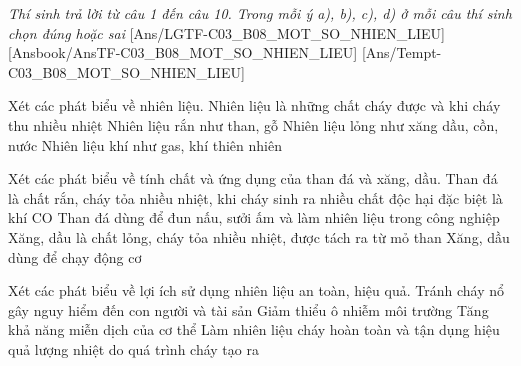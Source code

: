 \documentclass[Main.tex]{subfiles}
\begin{document}
\textit{\large Thí sinh trả lời từ câu 1 đến câu 10. Trong mỗi ý a), b), c), d) ở mỗi câu thí sinh chọn đúng hoặc sai}
[Ans/LGTF-C03_B08_MOT_SO_NHIEN_LIEU]
[Ansbook/AnsTF-C03_B08_MOT_SO_NHIEN_LIEU]
[Ans/Tempt-C03_B08_MOT_SO_NHIEN_LIEU]
\setcounter{ex}{0}

\begin{ex}%
	Xét các phát biểu về nhiên liệu.
	\choiceTF
	{Nhiên liệu là những chất cháy được và khi cháy thu nhiều nhiệt}
	{\True Nhiên liệu rắn như than, gỗ}
	{Nhiên liệu lỏng như xăng dầu, cồn, nước}
	{\True Nhiên liệu khí như gas, khí thiên nhiên}
\end{ex}

\begin{ex}%
	Xét các phát biểu về tính chất và ứng dụng của than đá và xăng, dầu.
	\choiceTF
	{\True Than đá là chất rắn, cháy tỏa nhiều nhiệt, khi cháy sinh ra nhiều chất độc hại đặc biệt là khí CO}
	{\True Than đá dùng để đun nấu, sưởi ấm và làm nhiên liệu trong công nghiệp}
	{Xăng, dầu là chất lỏng, cháy tỏa nhiều nhiệt, được tách ra từ mỏ than}
	{\True Xăng, dầu dùng để chạy động cơ}
\end{ex}

\begin{ex}%
	Xét các phát biểu về lợi ích sử dụng nhiên liệu an toàn, hiệu quả.
	\choiceTF
	{\True Tránh cháy nổ gây nguy hiểm đến con người và tài sản}
	{\True Giảm thiểu ô nhiễm môi trường}
	{Tăng khả năng miễn dịch của cơ thể}
	{\True Làm nhiên liệu cháy hoàn toàn và tận dụng hiệu quả lượng nhiệt do quá trình cháy tạo ra}
\end{ex}
\end{document}

